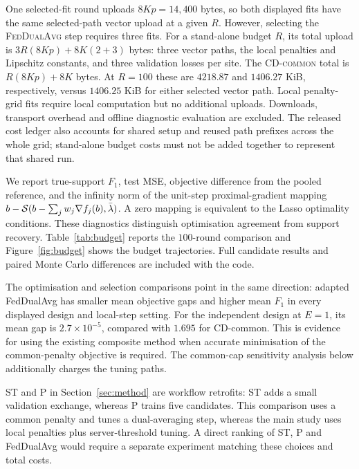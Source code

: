 One selected-fit round uploads $8Kp=14{,}400$ bytes, so both displayed fits
have the same selected-path vector upload at a given $R$. However, selecting
the \textsc{FedDualAvg} step requires three fits. For a stand-alone budget
$R$, its total upload is $3R(8Kp)+8K(2+3)$ bytes: three vector paths,
the local penalties and Lipschitz constants, and three validation losses
per site. The \textsc{CD-common} total is $R(8Kp)+8K$ bytes. At $R=100$
these are $4218.87$ and $1406.27$ KiB, respectively, versus $1406.25$ KiB
for either selected vector path. Local penalty-grid fits require local
computation but no additional uploads. Downloads, transport overhead and
offline diagnostic evaluation are excluded. The released cost ledger also
accounts for shared setup and reused path prefixes across the whole grid;
stand-alone budget costs must not be added together to represent that
shared run.

We report true-support $F_1$, test MSE, objective difference from the
pooled reference, and the infinity norm of the unit-step proximal-gradient
mapping
$b-\mathcal{S}(b-\sum_jw_j\nabla f_j(b),\bar\lambda)$.
A zero mapping is equivalent to the Lasso optimality conditions. These
diagnostics distinguish optimisation agreement from support recovery.
Table~\ref{tab:budget} reports the $100$-round comparison and
Figure~\ref{fig:budget} shows the budget trajectories. Full candidate
results and paired Monte Carlo differences are included with the code.



The optimisation and selection comparisons point in the same direction:
adapted FedDualAvg has smaller mean objective gaps and higher mean $F_1$
in every displayed design and local-step setting. For the independent
design at $E=1$, its mean gap is $2.7\times10^{-5}$, compared with
$1.695$ for CD-common. This is evidence for using the existing composite
method when accurate minimisation of the common-penalty objective is
required. The common-cap sensitivity analysis below additionally charges
the tuning paths.

ST and P in Section~\ref{sec:method} are workflow retrofits: ST adds a
small validation exchange, whereas P trains five candidates. This
comparison uses a common penalty and tunes a dual-averaging step, whereas
the main study uses local penalties plus server-threshold tuning.
A direct ranking of ST, P and FedDualAvg would require a separate
experiment matching these choices and total costs.

